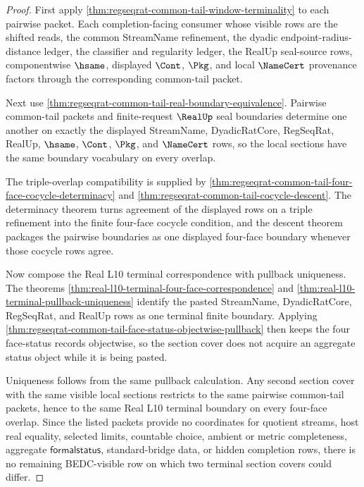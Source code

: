 \begin{proof}
First apply \autoref{thm:regseqrat-common-tail-window-terminality} to each pairwise packet. Each completion-facing consumer whose visible rows are the shifted reads, the common StreamName refinement, the dyadic endpoint-radius-distance ledger, the classifier and regularity ledger, the RealUp seal-source rows, componentwise $\hsame$, displayed $\Cont$, $\Pkg$, and local $\NameCert$ provenance factors through the corresponding common-tail packet.

Next use \autoref{thm:regseqrat-common-tail-real-boundary-equivalence}. Pairwise common-tail packets and finite-request $\RealUp$ seal boundaries determine one another on exactly the displayed StreamName, DyadicRatCore, RegSeqRat, RealUp, $\hsame$, $\Cont$, $\Pkg$, and $\NameCert$ rows, so the local sections have the same boundary vocabulary on every overlap.

The triple-overlap compatibility is supplied by \autoref{thm:regseqrat-common-tail-four-face-cocycle-determinacy} and \autoref{thm:regseqrat-common-tail-cocycle-descent}. The determinacy theorem turns agreement of the displayed rows on a triple refinement into the finite four-face cocycle condition, and the descent theorem packages the pairwise boundaries as one displayed four-face boundary whenever those cocycle rows agree.

Now compose the Real L10 terminal correspondence with pullback uniqueness. The theorems \autoref{thm:real-l10-terminal-four-face-correspondence} and \autoref{thm:real-l10-terminal-pullback-uniqueness} identify the pasted StreamName, DyadicRatCore, RegSeqRat, and RealUp rows as one terminal finite boundary. Applying \autoref{thm:regseqrat-common-tail-face-status-objectwise-pullback} then keeps the four face-status records objectwise, so the section cover does not acquire an aggregate status object while it is being pasted.

Uniqueness follows from the same pullback calculation. Any second section cover with the same visible local sections restricts to the same pairwise common-tail packets, hence to the same Real L10 terminal boundary on every four-face overlap. Since the listed packets provide no coordinates for quotient streams, host real equality, selected limits, countable choice, ambient or metric completeness, aggregate $\mathsf{formalstatus}$, standard-bridge data, or hidden completion rows, there is no remaining BEDC-visible row on which two terminal section covers could differ.
\end{proof}

